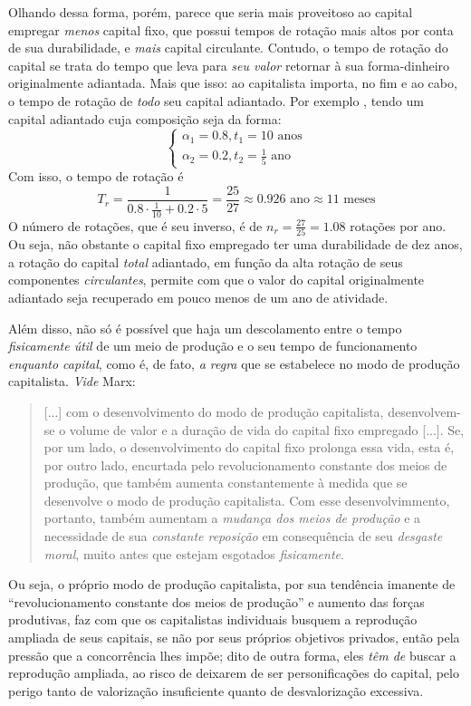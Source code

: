 Olhando dessa forma, porém, parece que seria mais proveitoso ao capital empregar \textit{menos} capital fixo, que possui tempos de rotação mais altos por conta de sua durabilidade, e \textit{mais} capital circulante. Contudo, o tempo de rotação do capital se trata do tempo que leva para \textit{seu valor} retornar à sua forma-dinheiro originalmente adiantada. Mais que isso: ao capitalista importa, no fim e ao cabo, o tempo de rotação de \textit{todo} seu capital adiantado. Por exemplo \parencite[p. 268]{Marx2014}, tendo um capital adiantado cuja composição seja da forma:
$$
\begin{cases}
    \alpha_1 = 0.8, t_1 = 10\text{ anos} \\
    \alpha_2 = 0.2, t_2 = \frac{1}{5}\text{ ano}
\end{cases}
$$
Com isso, o tempo de rotação é
$$
T_r = \frac{1}{0.8 \cdot \frac{1}{10} + 0.2 \cdot 5} = \frac{25}{27} \approx 0.926\text{ ano} \approx 11\text{ meses}
$$
O número de rotações, que é seu inverso, é de $n_r = \frac{27}{25} = 1.08$ rotações por ano. Ou seja, não obstante o capital fixo empregado ter uma durabilidade de dez anos, a rotação do capital \textit{total} adiantado, em função da alta rotação de seus componentes \textit{circulantes}, permite com que o valor do capital originalmente adiantado seja recuperado em pouco menos de um ano de atividade. 


Além disso, não só é possível que haja um descolamento entre o tempo \textit{fisicamente útil} de um meio de produção e o seu tempo de funcionamento \textit{enquanto capital}, como é, de fato, \textit{a regra} que se estabelece no modo de produção capitalista. \textit{Vide} Marx:
\begin{quote}
    [...] com o desenvolvimento do modo de produção capitalista, desenvolvem-se o volume de valor e a duração de vida do capital fixo empregado [...]. Se, por um lado, o desenvolvimento do capital fixo prolonga essa vida, esta é, por outro lado, encurtada pelo revolucionamento constante dos meios de produção, que também aumenta constantemente à medida que se desenvolve o modo de produção capitalista. Com esse desenvolvimmento, portanto, também aumentam a \textit{mudança dos meios de produção} e a necessidade de sua \textit{constante reposição} em consequência de seu \textit{desgaste moral}, muito antes que estejam esgotados \textit{fisicamente}. \parencite[p. 269, grifo meu]{Marx2014}
\end{quote}

Ou seja, o próprio modo de produção capitalista, por sua tendência imanente de ``revolucionamento constante dos meios de produção'' e aumento das forças produtivas, faz com que os capitalistas individuais busquem a reprodução ampliada de seus capitais, se não por seus próprios objetivos privados, então pela pressão que a concorrência lhes impõe; dito de outra forma, eles \textit{têm de} buscar a reprodução ampliada, ao risco de deixarem de ser personificações do capital, pelo perigo tanto de valorização insuficiente quanto de desvalorização excessiva.

